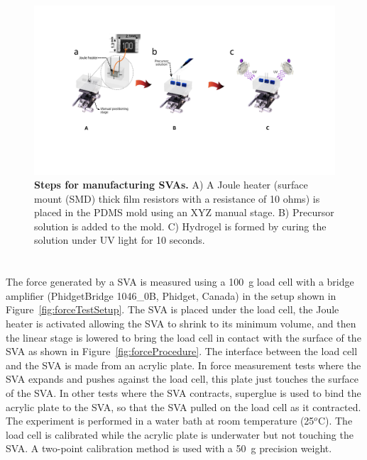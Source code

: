 \begin{figure}[h]
      \centering
      \includegraphics[width=\textwidth]{svaManufacturing.pdf}
      \caption[]{\textbf{Steps for manufacturing SVAs.} A) A Joule heater (surface mount (SMD) thick film resistors with a resistance of 10 ohms) is placed in the PDMS mold using an XYZ manual stage. B) Precursor solution is added to the mold. C) Hydrogel is formed by curing the solution under UV light for 10 seconds.}
      \label{fig:Manufac}
\end{figure}

\section{}
\label{sec:forcemeasur}
The force generated by a SVA is measured using a 100~g load cell with a bridge amplifier (PhidgetBridge 1046_0B, Phidget, Canada) in the setup shown in Figure~\ref{fig:forceTestSetup}. The SVA is placed under the load cell, the Joule heater is activated allowing the SVA to shrink to its minimum volume, and then the linear stage is lowered to bring the load cell in contact with the surface of the SVA as shown in Figure~\ref{fig:forceProcedure}. The interface between the load cell and the SVA is made from an acrylic plate. In force measurement tests where the SVA expands and pushes against the load cell, this plate just touches the surface of the SVA. In other tests where the SVA contracts, superglue is used to bind the acrylic plate to the SVA, so that the SVA pulled on the load cell as it contracted. The experiment is performed in a water bath at room temperature (25$^o$C). The load cell is calibrated while the acrylic plate is underwater but not touching the SVA. A two-point calibration method is used with a 50~g precision weight. 


